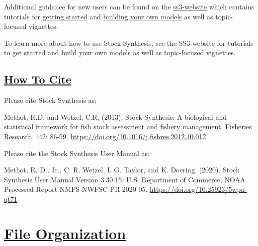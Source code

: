 Additional guidance for new users can be found on the \href{https://nmfs-ost.github.io/ss3-website/}{ss3-website} which contains tutorials for \href{https://nmfs-ost.github.io/ss3-website/qmds/getting_started_ss3.html}{getting started} and \href{https://github.com/nmfs-ost/ss3-source-code#how-can-i-learn-how-to-use-stock-synthesis}{building your own models} as well as topic-focused vignettes. 
 
To learn more about how to use Stock Synthesis, see the SS3 website for tutorials to get started and build your own models as well as topic-focused vignettes.

\hypertarget{HowToCite}{}
\subsection[How To Cite]{\protect\hyperlink{HowToCite}{How To Cite}}
Please cite Stock Synthesis as:

Methot, R.D. and Wetzel, C.R. (2013). Stock Synthesis: A biological and statistical
framework for fish stock assessment and fishery management. Fisheries Research, 
142: 86-99. \href{https://doi.org/10.1016/j.fishres.2012.10.012}{https://doi.org/10.1016/j.fishres.2012.10.012}

Please cite the Stock Synthesis User Manual as:

Methot, R. D., Jr., C. R. Wetzel, I. G. Taylor, and K. Doering. (2020). Stock Synthesis User Manual Version 3.30.15. U.S. Department of Commerce, NOAA Processed Report NMFS-NWFSC-PR-2020-05. \href{https://doi.org/10.25923/5wpn-qt71}{https://doi.org/10.25923/5wpn-qt71}

\pagebreak
		
\section[File Organization]{\protect\hyperref[FileOrganization]{File Organization}}\label{FileOrganization}
\hypertarget{InputFiles}{}
